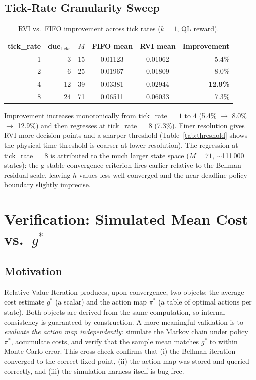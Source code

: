 \documentclass[11pt,a4paper]{article}
\begin{document}
\subsection{Tick-Rate Granularity Sweep}

\begin{table}[h]
\centering
\caption{RVI vs.\ FIFO improvement across tick rates ($k=1$, QL reward).}
\label{tab:sectionC}
\begin{tabular}{rrrccr}
\toprule
tick\_rate & due$_\text{ticks}$ & $M$ & FIFO mean & RVI mean & Improvement \\
\midrule
1 &  3 & 15 & 0.01123 & 0.01062 &  5.4\% \\
2 &  6 & 25 & 0.01967 & 0.01809 &  8.0\% \\
4 & 12 & 39 & 0.03381 & 0.02944 & \textbf{12.9\%} \\
8 & 24 & 71 & 0.06511 & 0.06033 &  7.3\% \\
\bottomrule
\end{tabular}
\end{table}

Improvement increases monotonically from tick\_rate $= 1$ to $4$ (5.4\%
$\to$ 8.0\% $\to$ 12.9\%) and then regresses at tick\_rate $= 8$ (7.3\%).
Finer resolution gives RVI more decision points and a sharper threshold
(Table~\ref{tab:threshold} shows the physical-time threshold is coarser
at lower resolution).  The regression at tick\_rate $= 8$ is attributed to
the much larger state space ($M=71$, $\sim$111\,000 states): the g-stable
convergence criterion fires earlier relative to the Bellman-residual scale,
leaving $h$-values less well-converged and the near-deadline policy boundary
slightly imprecise.


\section{Verification: Simulated Mean Cost vs.\ $g^*$}
\label{sec:verification}

\subsection{Motivation}

Relative Value Iteration produces, upon convergence, two objects: the
average-cost estimate $g^*$ (a scalar) and the action map $\pi^*$ (a table of
optimal actions per state).  Both objects are derived from the same computation,
so internal consistency is guaranteed by construction.  A more meaningful
validation is to \emph{evaluate the action map independently}: simulate the
Markov chain under policy $\pi^*$, accumulate costs, and verify that the sample
mean matches $g^*$ to within Monte Carlo error.  This cross-check confirms that
(i) the Bellman iteration converged to the correct fixed point, (ii) the
action map was stored and queried correctly, and (iii) the simulation harness
itself is bug-free.
\end{document}
